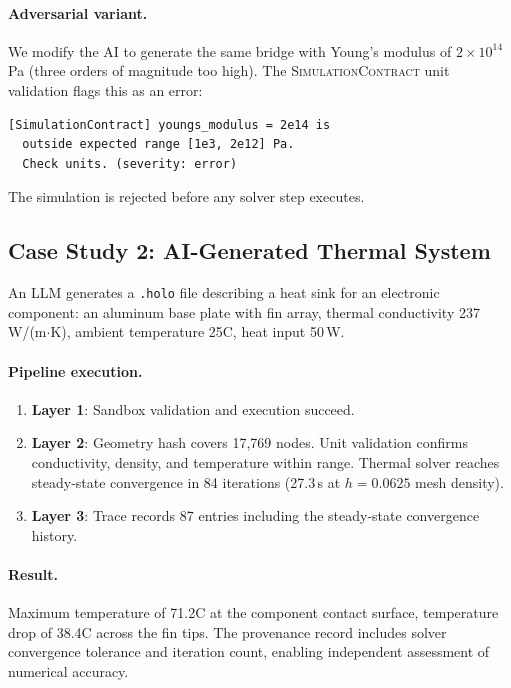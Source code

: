 \documentclass[letterpaper,twocolumn,10pt]{article}
\newcommand{\simcontract}{\textsc{SimulationContract}}
\begin{document}
\paragraph{Adversarial variant.} We modify the AI to generate the
same bridge with Young's modulus of $2 \times 10^{14}$\,Pa (three
orders of magnitude too high). The \simcontract{} unit validation
flags this as an error:

\begin{lstlisting}
[SimulationContract] youngs_modulus = 2e14 is
  outside expected range [1e3, 2e12] Pa.
  Check units. (severity: error)
\end{lstlisting}

The simulation is rejected before any solver step executes.

\subsection{Case Study 2: AI-Generated Thermal System}

An LLM generates a \texttt{.holo} file describing a heat sink for
an electronic component: an aluminum base plate with fin array,
thermal conductivity 237\,W/(m$\cdot$K), ambient temperature 25\textdegree C,
heat input 50\,W.

\paragraph{Pipeline execution.}
\begin{enumerate}[leftmargin=*,topsep=2pt,itemsep=1pt]
  \item \textbf{Layer 1}: Sandbox validation and execution succeed.
  \item \textbf{Layer 2}: Geometry hash covers 17{,}769 nodes.
    Unit validation confirms conductivity, density, and temperature
    within range. Thermal solver reaches steady-state convergence
    in 84 iterations (27.3\,s at $h{=}0.0625$ mesh density).
  \item \textbf{Layer 3}: Trace records 87 entries including
    the steady-state convergence history.
\end{enumerate}

\paragraph{Result.} Maximum temperature of 71.2\textdegree C at the
component contact surface, temperature drop of 38.4\textdegree C
across the fin tips. The provenance record includes solver convergence
tolerance and iteration count, enabling independent assessment of
numerical accuracy.
\end{document}
